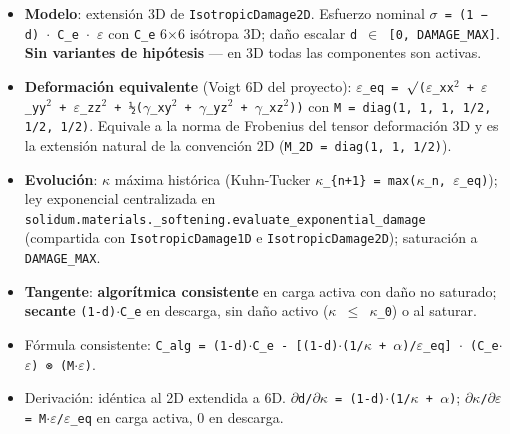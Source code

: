 \documentclass[11pt,letterpaper,oneside]{report}
\begin{document}
\begin{itemize}
  \item \textbf{Modelo}: extensión 3D de \texttt{IsotropicDamage2D}. Esfuerzo nominal \texttt{\ensuremath{\sigma} = (1 − d) \ensuremath{\cdot} C\_e \ensuremath{\cdot} \ensuremath{\varepsilon}} con \texttt{C\_e} 6\ensuremath{\times}6 isótropa 3D; daño escalar \texttt{d \ensuremath{\in} [0, DAMAGE\_MAX]}. \textbf{Sin variantes de hipótesis} --- en 3D todas las componentes son activas.
  \item \textbf{Deformación equivalente} (Voigt 6D del proyecto): \texttt{\ensuremath{\varepsilon}\_eq = \ensuremath{\surd}(\ensuremath{\varepsilon}\_xx\ensuremath{^{2}} + \ensuremath{\varepsilon}\_yy\ensuremath{^{2}} + \ensuremath{\varepsilon}\_zz\ensuremath{^{2}} + ½(\ensuremath{\gamma}\_xy\ensuremath{^{2}} + \ensuremath{\gamma}\_yz\ensuremath{^{2}} + \ensuremath{\gamma}\_xz\ensuremath{^{2}}))} con \texttt{M = diag(1, 1, 1, 1/2, 1/2, 1/2)}. Equivale a la norma de Frobenius del tensor deformación 3D y es la extensión natural de la convención 2D (\texttt{M\_2D = diag(1, 1, 1/2)}).
  \item \textbf{Evolución}: \ensuremath{\kappa} máxima histórica (Kuhn-Tucker \texttt{\ensuremath{\kappa}\_\{n+1\} = max(\ensuremath{\kappa}\_n, \ensuremath{\varepsilon}\_eq)}); ley exponencial centralizada en \texttt{solidum.materials.\_softening.evaluate\_exponential\_damage} (compartida con \texttt{IsotropicDamage1D} e \texttt{IsotropicDamage2D}); saturación a \texttt{DAMAGE\_MAX}.
  \item \textbf{Tangente}: \textbf{algorítmica consistente} en carga activa con daño no saturado; \textbf{secante} \texttt{(1-d)\ensuremath{\cdot}C\_e} en descarga, sin daño activo (\texttt{\ensuremath{\kappa} \ensuremath{\le} \ensuremath{\kappa}\_0}) o al saturar.
  \item Fórmula consistente: \texttt{C\_alg = (1-d)\ensuremath{\cdot}C\_e - [(1-d)\ensuremath{\cdot}(1/\ensuremath{\kappa} + \ensuremath{\alpha})/\ensuremath{\varepsilon}\_eq] \ensuremath{\cdot} (C\_e\ensuremath{\cdot}\ensuremath{\varepsilon}) ⊗ (M\ensuremath{\cdot}\ensuremath{\varepsilon})}.
  \item Derivación: idéntica al 2D extendida a 6D. \texttt{\ensuremath{\partial}d/\ensuremath{\partial}\ensuremath{\kappa} = (1-d)\ensuremath{\cdot}(1/\ensuremath{\kappa} + \ensuremath{\alpha})}; \texttt{\ensuremath{\partial}\ensuremath{\kappa}/\ensuremath{\partial}\ensuremath{\varepsilon} = M\ensuremath{\cdot}\ensuremath{\varepsilon}/\ensuremath{\varepsilon}\_eq} en carga activa, 0 en descarga.

\end{itemize}
\end{document}
